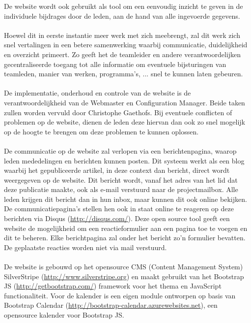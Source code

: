 De website wordt ook gebruikt als tool om een eenvoudig inzicht te geven in de individuele bijdrages door de leden, aan de hand van alle ingevoerde gegevens. 
\\
\\
Hoewel dit in eerste instantie meer werk met zich meebrengt, zal dit werk zich snel vertalingen in een betere samenwerking waarbij communicatie, duidelijkheid en overzicht primeert. Zo geeft het de teamleider en andere verantwoordelijken gecentraliseerde toegang tot alle informatie om eventuele bijsturingen van teamleden, manier van werken, programma’s, ... snel te kunnen laten gebeuren.
\\
\\
De implementatie, onderhoud en controle van de website is de verantwoordelijkheid van de Webmaster en Configuration Manager. Beide taken zullen worden vervuld door Christophe Gaethofs. Bij eventuele conflicten of problemen op de website, dienen de leden deze hiervan dan ook zo snel mogelijk op de hoogte te brengen om deze problemen te kunnen oplossen.
\\
\\
De communicatie op de website zal verlopen via een berichtenpagina, waarop leden mededelingen en berichten kunnen posten. Dit systeem werkt als een blog waarbij het gepubliceerde artikel, in deze context dan bericht, direct wordt weergegeven op de website. Dit bericht wordt, vanaf het adres van het lid dat deze publicatie maakte, ook als e-mail verstuurd naar de projectmailbox. Alle leden krijgen dit bericht dan in hun inbox, maar kunnen dit ook online bekijken. De communicatiepagina's stellen hen ook in staat online te reageren op deze berichten via Disqus (\url{http://disqus.com/}). Deze open source tool geeft een website de mogelijkheid om een reactieformulier aan een pagina toe te voegen en dit te beheren. Elke berichtpagina zal onder het bericht zo'n formulier bevatten. De geplaatste reacties worden niet via mail verstuurd.
\\
\\
De website is gebouwd op het opensource CMS (Content Management System) SilverStripe (\url{http://www.silverstripe.org}) en maakt gebruikt van het Bootstrap JS (\url{http://getbootstrap.com/}) framework voor het thema en JavaScript functionaliteit. Voor de kalender is een eigen module ontworpen op basis van Bootstrap Calendar (\url{http://bootstrap-calendar.azurewebsites.net}), een opensource kalender voor Bootstrap JS.
\\
\\

